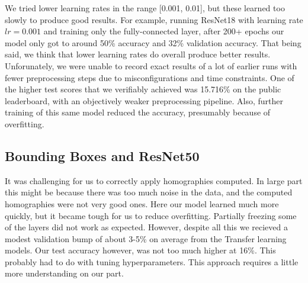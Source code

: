 We tried lower learning rates in the range [0.001, 0.01], but these learned too slowly to produce good results. For example, running ResNet18 with learning rate $lr = 0.001$ and training only the fully-connected layer, after 200+ epochs our model only got to around 50\% accuracy and 32\% validation accuracy. That being said, we think that lower learning rates do overall produce better results. Unforunately, we were unable to record exact results of a lot of earlier runs with fewer preprocessing steps due to misconfigurations and time constraints. One of the higher test scores that we verifiably achieved was 15.716\% on the public leaderboard, with an objectively weaker preprocessing pipeline. Also, further training of this same model reduced the accuracy, presumably because of overfitting.

\subsection{Bounding Boxes and ResNet50}

It was challenging for us to correctly apply homographies computed. In large part this might be because there was too much noise in the data, and the computed homographies were not very good ones. Here our model learned much more quickly, but it became tough for us to reduce overfitting. Partially freezing some of the layers did not work as expected. However, despite all this we recieved a modest validation bump of about 3-5\% on average from the Transfer learning models. Our test accuracy however, was not too much higher at 16\%. This probably had to do with tuning hyperparameters. This approach requires a little more understanding on our part. 

